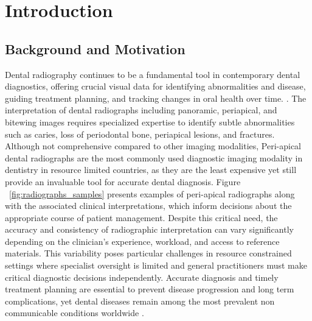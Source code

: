\documentclass[12pt,a4paper]{report}
\begin{document}
	\clearpage
	\tableofcontents
	\clearpage
	\listoffigures
	\clearpage
	\listoftables
	
	\clearpage
	\setcounter{page}{1}   %
	
	
	
	
	
	\chapter{Introduction}
	\label{chap:introduction}
	
	\section{Background and Motivation}
	
	Dental radiography continues to be a fundamental tool in contemporary dental diagnostics, offering crucial visual data for identifying abnormalities and disease, guiding treatment planning, and tracking changes in oral health over time. \cite{white_pharoah_radiology}. The interpretation of dental radiographs including panoramic, periapical, and bitewing images requires specialized expertise to identify subtle abnormalities such as caries, loss of periodontal bone, periapical lesions, and fractures. Although not comprehensive compared to other imaging modalities, Peri-apical dental radiographs are the most commonly used diagnostic imaging modality in dentistry in resource limited countries, as they are the least expensive yet still provide an invaluable tool for accurate dental diagnosis. Figure ~\ref{fig:radiographs_samples} presents examples of peri-apical radiographs along with the associated clinical interpretations, which inform decisions about the appropriate course of patient management.  Despite this critical need, the accuracy and consistency of radiographic interpretation can vary significantly depending on the clinician's experience, workload, and access to reference materials. This variability poses particular challenges in resource constrained settings where specialist oversight is limited and general practitioners must make critical diagnostic decisions independently. Accurate diagnosis and timely treatment planning are essential to prevent disease progression and long term complications, yet dental diseases remain among the most prevalent non communicable conditions worldwide \cite{who_oral_health, world2024global}.
	
\end{document}
